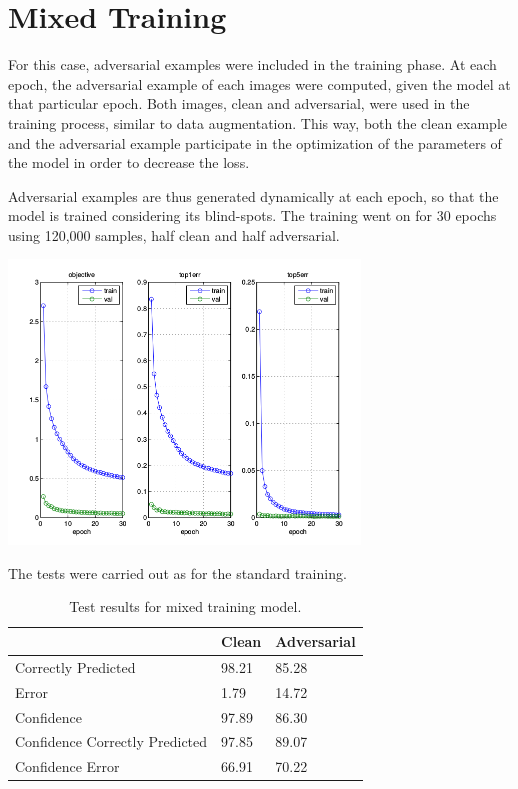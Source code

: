 \section{Mixed Training}

For this case, adversarial examples were included in the training phase. At each epoch, the adversarial example of each images were computed, given the model at that particular epoch. Both images, clean and adversarial, were used in the training process, similar to data augmentation. This way, both the clean example and the adversarial example participate in the optimization of the parameters of the model in order to decrease the loss.

Adversarial examples are thus generated dynamically at each epoch, so that the model is trained considering its blind-spots.
The training went on for 30 epochs using 120,000 samples, half clean and half adversarial.

\begin{center}
  \includegraphics[width=0.7\textwidth]{img/train-mix.png}
	\label{train-mix} 
\end{center}

The tests were carried out as for the standard training.

\FloatBarrier
\begin{table}[h]
\centering
\begin{tabular}{@{}lll@{}}
\toprule
                               & Clean & Adversarial \\ \midrule
Correctly Predicted            & 98.21 & 85.28       \\
Error                          & 1.79  & 14.72       \\
Confidence                     & 97.89 & 86.30       \\
Confidence Correctly Predicted & 97.85 & 89.07       \\
Confidence Error               & 66.91 & 70.22       \\ \bottomrule
\end{tabular}
\caption{Test results for mixed training model.}
\label{mixed-test}
\end{table}
\FloatBarrier

